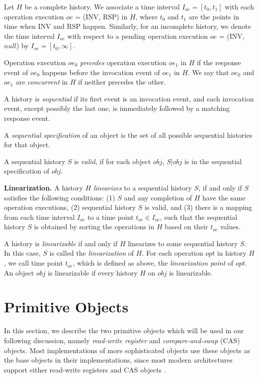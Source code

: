 Let $H$ be a complete history. We associate a time interval $I_{oe} = [t_0, t_1]$ with each
operation execution $oe$ = (INV, RSP) in $H$, where $t_0$ and $t_1$ are the points in time when INV and RSP happen.
Similarly, for an incomplete history, we denote the time interval $I_{oe}$ with respect to a pending
operation execution $oe$ = (INV, $null$) by $I_{oe} = [t_0, \infty]$.

Operation execution $oe_0$ \emph{precedes} operation execution $oe_1$ in $H$ if the response event of
$oe_0$ happens before the invocation event of $oe_1$ in $H$.
We say that $oe_0$ and $oe_1$ are \emph{concurrent} in $H$ if neither precedes the other.

A history is \emph{sequential} if its first event is an invocation event, and each invocation event, except
possibly the last one, is immediately followed by a matching response event.

A \emph{sequential specification} of an object is the set of all possible sequential histories
for that object.

A sequential history $S$ is \emph{valid}, if for each object $obj$, $S|obj$ is
in the sequential specification of $obj$.

\textbf{Linearization.}
A history $H$ \emph{linearizes} to a sequential history $S$, if and only if $S$ satisfies the
following conditions: (1) $S$ and any completion of $H$ have the same operation executions, (2) sequential history $S$ is
valid, and (3) there is a mapping from each time interval $I_{oe}$ to a time point $t_{oe} \in I_{oe}$, such
that the sequential history $S$ is obtained by sorting the operations in $H$ based on their $t_{oe}$ values.

A history is \emph{linearizable} if and only if $H$ linearizes to some sequential history $S$. In this case,
$S$ is called the \emph{linearization} of $H$. For each operation $opt$ in history $H$, we call time point $t_{oe}$, which is
defined as above, the \emph{linearization point} of $opt$. An object $obj$ is linearizable if every
history $H$ on $obj$ is linearizable.

\section{Primitive Objects}
In this section, we describe the two primitive objects which will be used in our following discussion,
namely \emph{read-write register} and \emph{compare-and-swap} (CAS) objects. Most implementations
of more sophisticated objects use these objects as the base objects in their implementations,
since most modern architectures support either read-write registers and CAS objects \cite{itanium} \cite{weaver1994sparc}.

